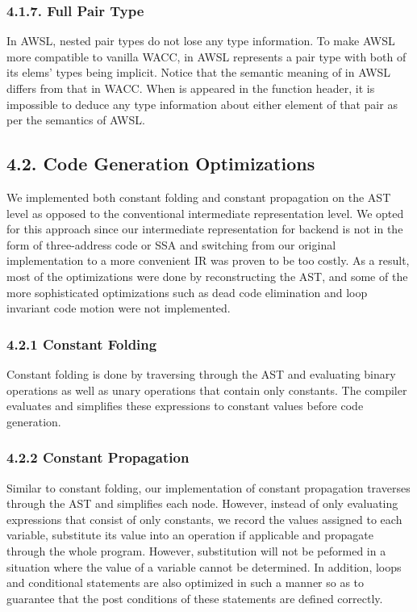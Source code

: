 \documentclass[10pt,a4paper]{report}
\begin{document}
  \subsubsection*{4.1.7. Full Pair Type}
  In AWSL, nested pair types do not lose any type information. To make AWSL more compatible to vanilla WACC,  in AWSL represents
  a pair type with both of its elems' types being implicit. Notice that the semantic meaning of  in AWSL differs from that in WACC. 
  When  is appeared in the function header, it is impossible to deduce any type information about either element of that pair as 
  per the semantics of AWSL.

  \subsection*{4.2. Code Generation Optimizations}
  We implemented both constant folding and constant propagation on the AST level
  as opposed to the conventional intermediate representation level. We opted for
  this approach since our intermediate representation for backend is not in the
  form of three-address code or SSA and switching from our original
  implementation to a more convenient IR was proven to be too costly. As a
  result, most of the optimizations were done by reconstructing the AST, and
  some of the more sophisticated optimizations such as dead code elimination and
  loop invariant code motion were not implemented.
  \subsubsection*{4.2.1	Constant Folding}
  Constant folding is done by traversing through the AST and evaluating binary operations as well as unary operations that contain only constants.
  The compiler evaluates and simplifies these expressions to constant values before code generation.
  \subsubsection*{4.2.2	Constant Propagation}
  Similar to constant folding, our implementation of constant propagation traverses through the AST and simplifies each node. However, instead of 
  only evaluating expressions that consist of only constants, we record the values assigned to each variable, substitute its value into
  an operation if applicable and propagate through the whole program. However, substitution will not be peformed in a situation where the value of 
  a variable cannot be determined. In addition, loops and conditional statements are also optimized in such a manner so as to guarantee that the 
  post conditions of these statements are defined correctly.
\end{document}
